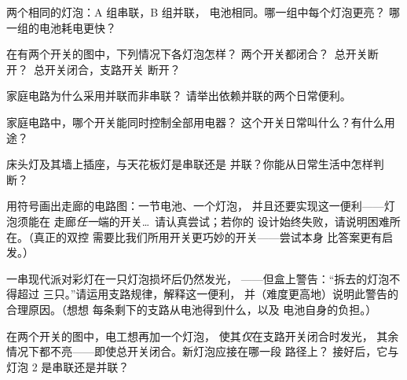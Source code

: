 \begin{exercise}[$\star$]\label{exo:g5:series-parallel-circuits:4}
两个相同的灯泡：A 组串联，B 组并联，
电池相同。哪一组中每个灯泡更亮？
哪一组的电池耗电更快？
\end{exercise}

\begin{exercise}[$\star$]\label{exo:g5:series-parallel-circuits:5}
在有两个开关的图中，下列情况下各灯泡怎样？
两个开关都闭合？\ 总开关断开？\ 总开关闭合，支路开关
断开？
\end{exercise}

\begin{exercise}[$\star$]\label{exo:g5:series-parallel-circuits:6}
家庭电路为什么采用并联而非串联？
请举出依赖并联的两个日常便利。
\end{exercise}

\begin{exercise}[$\star$]\label{exo:g5:series-parallel-circuits:7}
家庭电路中，哪个开关能同时控制全部用电器？
这个开关日常叫什么？有什么用途？
\end{exercise}

\begin{exercise}[$\star$]\label{exo:g5:series-parallel-circuits:8}
床头灯及其墙上插座，与天花板灯是串联还是
并联？你能从日常生活中怎样判断？
\end{exercise}

\begin{exercise}[$\star\star$]\label{exo:g5:series-parallel-circuits:9}
用符号画出走廊的电路图：一节电池、一个灯泡，
并且还要实现这一便利——灯泡须能在
走廊\emph{任一}端的开关\dots\ 请认真尝试；若你的
设计始终失败，请说明困难所在。（真正的双控
需要比我们所用开关更巧妙的开关——尝试本身
比答案更有启发。）
\end{exercise}

\begin{exercise}[$\star\star$]\label{exo:g5:series-parallel-circuits:10}
一串现代派对彩灯在一只灯泡损坏后仍然发光，
——但盒上警告：“拆去的灯泡不得超过
三只。”请运用支路规律，解释这一便利，
并（难度更高地）说明此警告的合理原因。（想想
每条剩下的支路从电池得到什么，以及
电池自身的负担。）
\end{exercise}

\begin{exercise}[$\star\star$]\label{exo:g5:series-parallel-circuits:11}
在两个开关的图中，电工想再加一个灯泡，
使其\emph{仅}在支路开关闭合时发光，
其余情况下都不亮——即使总开关闭合。新灯泡应接在哪一段
路径上？
接好后，它与灯泡 2 是串联还是并联？
\end{exercise}
